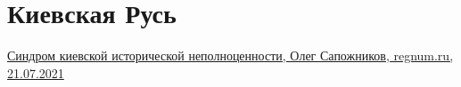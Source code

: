 
 
 
 
 
\chapter{Киевская Русь}
\label{sec:topics.kievrus}


\href{https://regnum.ru/news/polit/3327323.html}{%
Синдром киевской исторической неполноценности, Олег Сапожников, regnum.ru, 21.07.2021%
}

